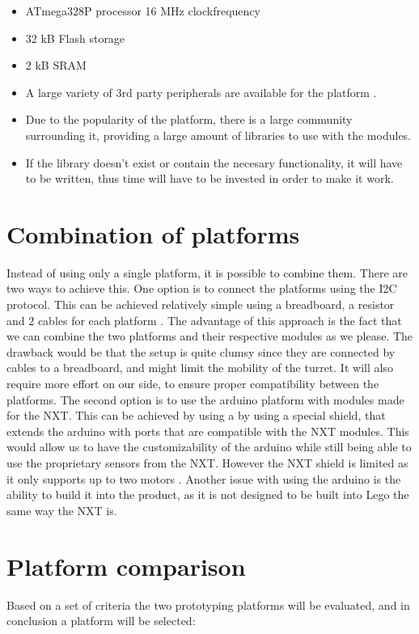 \begin{itemize}
  \item ATmega328P processor 16 MHz clockfrequency
  \item 32 kB Flash storage
  \item 2 kB SRAM
  \item A large variety of 3rd party peripherals are available for the platform
  \citep{ArduinoComponents}.
  \item Due to the popularity of the platform, there is a large community
  surrounding it, providing a large amount of libraries to use with the
  modules.
  \item If the library doesn't exist or contain the necesary functionality, it
  will have to be written, thus time will have to be invested in order to make
  it work.
\end{itemize}

\section{Combination of platforms}
Instead of using only a single platform, it is possible to combine them. There
are two ways to achieve this. One option is to connect the platforms using the
I2C protocol. This can be achieved relatively simple using a breadboard, a
resistor and 2 cables for each platform \citep{ArduinoNXT}. The advantage of
this approach is the fact that we can combine the two platforms and their
respective modules as we please. The drawback would be that the setup is quite
clumsy since they are connected by cables to a breadboard, and might limit the
mobility of the turret. It will also require more effort on our side, to ensure
proper compatibility between the platforms.
The second option is to use the arduino platform with modules made for the NXT.
This can be achieved by using a by using a special shield, that extends the
arduino with ports that are compatible with the NXT modules. This would allow
us to have the customizability of the arduino while still being able to use the
proprietary sensors from the NXT. However the NXT shield is limited as it only
supports up to two motors \citep{NXTShield}. Another issue with using the
arduino is the ability to build it into the product, as it is not designed to
be built into Lego the same way the NXT is.\nl

\section{Platform comparison}
Based on a set of criteria the two prototyping platforms will be evaluated, and
in conclusion a platform will be selected:

